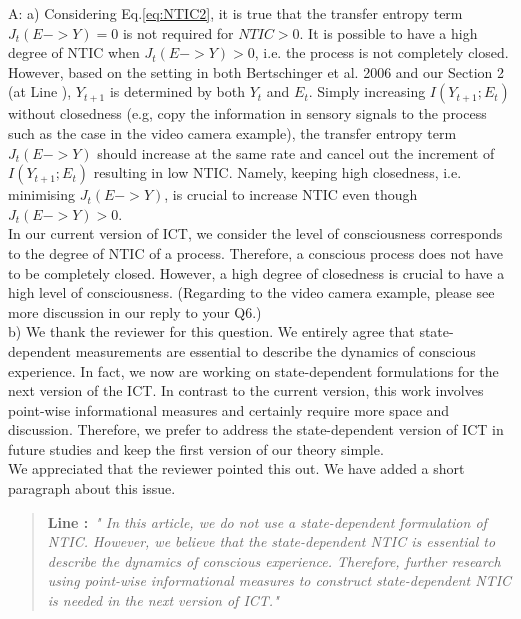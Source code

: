 \documentclass[utf8]{article}
\newenvironment{ans}  
    {\color{Black}\noindent A:}
    {~\newline}
\newcommand{\addnew}[2]{\blockcquote{}{\textbf{Line #1:}~\newline\textit{"#2"}}
}
\begin{document}
    	\begin{ans}
    		\newline
    		a) Considering Eq.\ref{eq:NTIC2}, it is true that the transfer entropy term $J_t(E -> Y)=0$ is not required for $NTIC>0$. It is possible to have a high degree of NTIC when $J_t(E -> Y) > 0$, i.e. the process is not completely closed.  \\
    		However, based on the setting in both Bertschinger et al. 2006 and our Section 2 (at Line ), $Y_{t+1}$ is determined by both $Y_t$ and $E_t$. Simply increasing $I(Y_{t+1}; E_t)$ without closedness (e.g, copy the information in sensory signals to the process such as the case in the video camera example), the transfer entropy term $J_t(E -> Y)$ should increase at the same rate and cancel out the increment of $I(Y_{t+1}; E_t)$ resulting in low NTIC. Namely, keeping high closedness, i.e. minimising $J_t(E -> Y)$, is crucial to increase NTIC even though $J_t(E -> Y) > 0$.\\
    		In our current version of ICT, we consider the level of consciousness corresponds to the degree of NTIC of a process. Therefore, a conscious process does not have to be completely closed. However, a high degree of closedness is crucial to have a high level of consciousness. (Regarding to the video camera example, please see more discussion in our reply to your Q6.) \\
    		
    		\noindent
    		b) We thank the reviewer for this question. We entirely agree that state-dependent measurements are essential to describe the dynamics of conscious experience. In fact, we now are working on state-dependent formulations for the next version of the ICT. In contrast to the current version, this work involves point-wise informational measures and certainly require more space and discussion. Therefore, we prefer to address the state-dependent version of ICT in future studies and keep the first version of our theory simple.\\
    		We appreciated that the reviewer pointed this out. We have added a short paragraph about this issue.
    	
	    	\addnew{}{
	    		In this article, we do not use a state-dependent formulation of NTIC. However, we believe that the state-dependent NTIC is essential to describe the dynamics of conscious experience. Therefore, further research using point-wise informational measures to construct state-dependent NTIC is needed in the next version of ICT.}

    	\end{ans}
        
\end{document}
